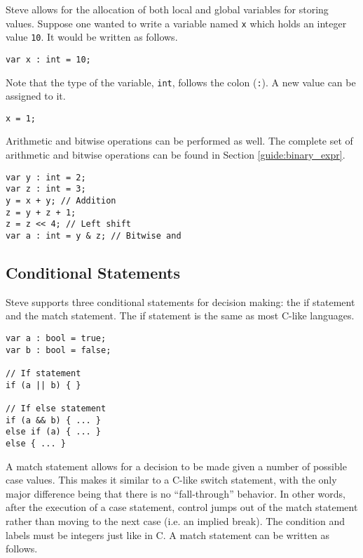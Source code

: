 Steve allows for the allocation of both local and global variables for storing values. Suppose one wanted to write a variable named \texttt{x} which holds an
integer value \texttt{10}. It would be written as follows.

\begin{codepage}
\begin{lstlisting}
var x : int = 10;
\end{lstlisting}
\end{codepage}

Note that the type of the variable, \texttt{int}, follows the colon
(\texttt{:}). A new value can be assigned to it.

\begin{codepage}
\begin{lstlisting}
x = 1;
\end{lstlisting}
\end{codepage}

Arithmetic and bitwise operations can be performed as well. The complete set of
arithmetic and bitwise operations can be found in Section
\ref{guide:binary_expr}.

\begin{codepage}
\begin{lstlisting}
var y : int = 2;
var z : int = 3;
y = x + y; // Addition
z = y + z + 1;
z = z << 4; // Left shift
var a : int = y & z; // Bitwise and
\end{lstlisting}
\end{codepage}


\subsection{Conditional Statements} \label{tut:condition}

Steve supports three conditional statements for decision making: the if statement and the match statement. The if statement is the same as most C-like languages.

\begin{codepage}
\begin{lstlisting}
var a : bool = true;
var b : bool = false;

// If statement
if (a || b) { }

// If else statement
if (a && b) { ... }
else if (a) { ... }
else { ... }
\end{lstlisting}
\end{codepage}

A match statement allows for a decision to be made given a number of possible
case values. This makes it similar to a C-like switch statement, with the only
major difference being that there is no ``fall-through'' behavior. In other
words, after the execution of a case statement, control jumps out of the match
statement rather than moving to the next case (i.e. an implied break). The
condition and labels must be integers just like in C. A match statement can be
written as follows.


